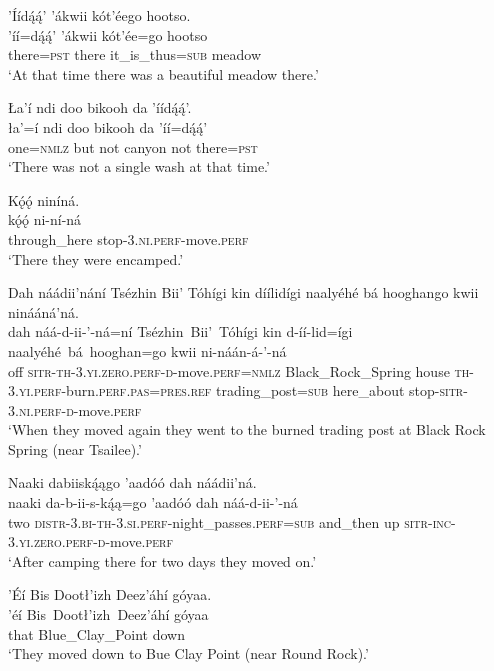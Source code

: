 \ea\label{ex:text3-6-7}
’Íídą́ą́’ ’ákwii kót’éego hootso.\\
\gll ’íí=dą́ą́’	’ákwii	kót’ée=go	hootso\\
     there=\textsc{pst}	there	it\_is\_thus=\textsc{sub}	meadow\\
\glt `At that time there was a beautiful meadow there.'
\z

\ea\label{ex:text3-6-8}
Ła’í ndi doo bikooh da ’íídą́ą́’.\\
\gll ła’=í	ndi	doo	bikooh	da	’íí=dą́ą́’\\
     one=\textsc{nmlz}	but	not	canyon	not	there=\textsc{pst}\\
\glt `There was not a single wash at that time.'
\z

\ea\label{ex:text3-6-9}
Kǫ́ǫ́ niníná.\\
\gll kǫ́ǫ́	ni-ní-ná\\
     through\_here	stop-3.\textsc{ni}.\textsc{perf}-move.\textsc{perf}\\
\glt `There they were encamped.'
\z

\ea\label{ex:text3-6-10}
Dah náádii’nání Tsézhin Bii’ Tóhígi kin díílidígi naalyéhé bá hooghango kwii ninááná’ná.\\
\gll dah	náá-d-ii-’-ná=ní	Tsézhin~Bii’~{Tóhígi}	kin	d-íí-lid=ígi	naalyéhé~bá~{hooghan=go}	kwii	ni-náán-á-’-ná\\
     off	\textsc{sitr}-\textsc{th}-3.\textsc{yi}.\textsc{zero}.\textsc{perf}-\textsc{d}-move.\textsc{perf}=\textsc{nmlz}	Black\_Rock\_Spring	house	\textsc{th}-3.\textsc{yi}.\textsc{perf}-burn.\textsc{perf}.\textsc{pas}=\textsc{pres}.\textsc{ref}	trading\_post=\textsc{sub}	here\_about	stop-\textsc{sitr}-3.\textsc{ni}.\textsc{perf}-\textsc{d}-move.\textsc{perf}\\
\glt `When they moved again they went to the burned trading post at Black Rock Spring (near Tsailee).'
\z

\ea\label{ex:text3-6-11}
Naaki dabiiską́ągo ’aadóó dah náádii’ná.\\
\gll naaki	da-b-ii-s-ką́ą=go	’aadóó	dah	náá-d-ii-’-ná\\
     two	\textsc{distr}-3.\textsc{bi}-\textsc{th}-3.\textsc{si}.\textsc{perf}-night\_passes.\textsc{perf}=\textsc{sub}	and\_then	up	\textsc{sitr}-\textsc{inc}-3.\textsc{yi}.\textsc{zero}.\textsc{perf}-\textsc{d}-move.\textsc{perf}\\
\glt `After camping there for two days they moved on.'
\z

\ea\label{ex:text3-6-12}
’Éí Bis Dootł’izh Deez’áhí góyaa.\\
\gll ’éí	Bis~Dootł’izh~{Deez’áhí}	góyaa\\
     that	Blue\_Clay\_Point	down\\
\glt `They moved down to Bue Clay Point (near Round Rock).'
\z

